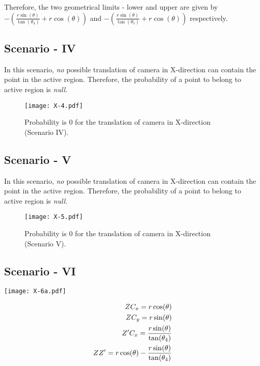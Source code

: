 Therefore, the two geometrical limits - lower and upper are given by $-(\frac{r\sin(\theta)}{\tan(\theta_4)} + r\cos(\theta))$ and $-(\frac{r\sin(\theta)}{\tan(\theta_5)} + r\cos(\theta))$ respectively.

\subsection{Scenario - IV}
In this scenario, \emph{no} possible translation of camera in X-direction can contain the point in the active region. Therefore, the probability of a point to belong to active region is \emph{null}.

\begin{figure}[H]
\centering
\texttt{[image: X-4.pdf]} 
\caption{Probability is $0$ for the translation of camera in X-direction (Scenario IV).}
\label{fig:SWIM-images}
\end{figure}


\subsection{Scenario - V}
In this scenario, \emph{no} possible translation of camera in X-direction can contain the point in the active region. Therefore, the probability of a point to belong to active region is \emph{null}.

\begin{figure}[htb]
\centering
\texttt{[image: X-5.pdf]} 
\caption{Probability is $0$ for the translation of camera in X-direction (Scenario V).}
\label{fig:SWIM-images}
\end{figure}



\subsection{Scenario - VI}

\begin{minipage}[t]{0.5\textwidth}
\texttt{[image: X-6a.pdf]}
\end{minipage}
\begin{minipage}[t]{0.5\textwidth}
\vspace{-2in}
\begin{equation*}
\centering
\begin{aligned}
ZC_x = r\cos(\theta) \\
ZC_y = r\sin(\theta) \\
Z'C_x = \frac{r\sin(\theta)}{\tan(\theta_4)}\\
ZZ' = r\cos(\theta) - \frac{r\sin(\theta)}{\tan(\theta_4)}
\end{aligned}
\end{equation*}
\end{minipage}





